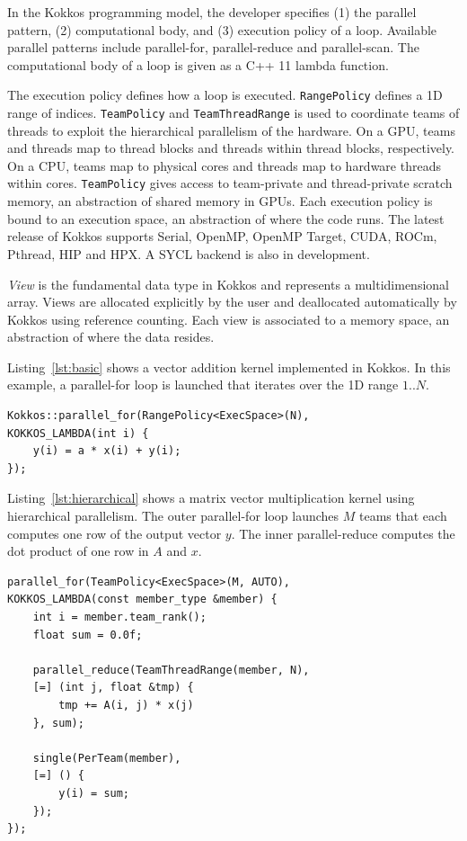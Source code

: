 \documentclass[conference]{IEEEtran}
\begin{document}
In the Kokkos programming model, the developer specifies (1) the parallel
pattern, (2) computational body, and (3) execution policy of a loop. Available
parallel patterns include parallel-for, parallel-reduce and parallel-scan. The
computational body of a loop is given as a C++ 11 lambda function.

The execution policy defines how a loop is executed. \texttt{RangePolicy}
defines a 1D range of indices. \texttt{TeamPolicy} and \texttt{TeamThreadRange}
is used to coordinate teams of threads to exploit the hierarchical parallelism
of the hardware. On a GPU, teams and threads map to thread blocks and threads
within thread blocks, respectively. On a CPU, teams map to physical cores and
threads map to hardware threads within cores. \texttt{TeamPolicy} gives access
to team-private and thread-private scratch memory, an abstraction of shared
memory in GPUs. Each execution policy is bound to an execution space, an
abstraction of where the code runs. The latest release of Kokkos supports
Serial, OpenMP, OpenMP Target, CUDA, ROCm, Pthread, HIP and HPX\@. A SYCL
backend is also in development.

\textit{View} is the fundamental data type in Kokkos and represents a
multidimensional array. Views are allocated explicitly by the user and
deallocated automatically by Kokkos using reference counting.
Each view is associated to a memory space, an abstraction of
where the data resides.

Listing~\ref{lst:basic} shows a vector addition  kernel implemented in Kokkos.
In this example, a parallel-for loop is launched that iterates over the 1D
range $1..N$.

\begin{lstlisting}[caption={Basic data parallel loop},label={lst:basic}]
Kokkos::parallel_for(RangePolicy<ExecSpace>(N),
KOKKOS_LAMBDA(int i) {
    y(i) = a * x(i) + y(i);
});
\end{lstlisting}

Listing~\ref{lst:hierarchical} shows a matrix vector multiplication kernel
using hierarchical parallelism. The outer parallel-for loop launches $M$ teams
that each computes one row of the output vector $y$. The inner parallel-reduce
computes the dot product of one row in $A$ and $x$.

\begin{lstlisting}[caption={Hierarchical data parallel loop},label={lst:hierarchical}]
parallel_for(TeamPolicy<ExecSpace>(M, AUTO),
KOKKOS_LAMBDA(const member_type &member) {
    int i = member.team_rank();
    float sum = 0.0f;

    parallel_reduce(TeamThreadRange(member, N),
    [=] (int j, float &tmp) {
        tmp += A(i, j) * x(j)
    }, sum);

    single(PerTeam(member),
    [=] () {
        y(i) = sum;
    });
});
\end{lstlisting}
\end{document}
